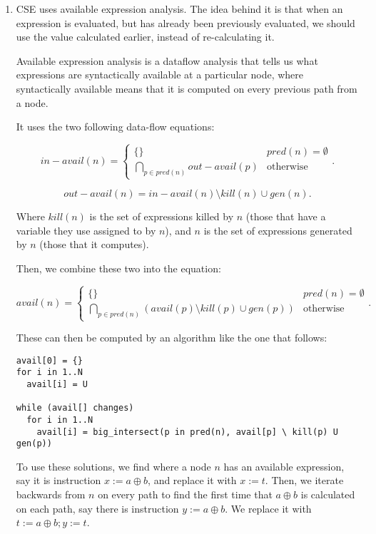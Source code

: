 


\begin{enumerate}[label=(\alph*)]

  \item

    CSE uses available expression analysis. The idea behind it is that when an expression is evaluated, but has already been previously evaluated, we should use the value calculated earlier, instead of re-calculating it.

    Available expression analysis is a dataflow analysis that tells us what expressions are syntactically available at a particular node, where syntactically available means that it is computed on every previous path from a node.

    It uses the two following data-flow equations:

    \[
      in-avail(n) = \begin{cases}\{\} & pred(n) = \emptyset\\\bigcap_{p \in pred(n)} out-avail(p)&\text{otherwise}\end{cases}
    .\] 

    \[
      out-avail(n) = in-avail(n) \setminus kill(n) \cup gen(n)
    .\] 

    Where $kill(n)$ is the set of expressions killed by $n$ (those that have a variable they use assigned to by $n$), and $n$ is the set of expressions generated by $n$ (those that it computes).

    Then, we combine these two into the equation:

    \[
      avail(n) = \begin{cases}\{\}&pred(n) = \emptyset\\\bigcap_{p \in pred(n)} \left(avail(p) \setminus kill(p) \cup gen(p)\right)&\text{otherwise}\end{cases}
    .\] 

    These can then be computed by an algorithm like the one that follows:

\begin{verbatim}
avail[0] = {}
for i in 1..N
  avail[i] = U

while (avail[] changes)
  for i in 1..N
    avail[i] = big_intersect(p in pred(n), avail[p] \ kill(p) U gen(p))
\end{verbatim}

To use these solutions, we find where a node $n$ has an available expression, say it is instruction $x := a \oplus b$, and replace it with $x := t$. Then, we iterate backwards from $n$ on every path to find the first time that $a \oplus b$ is calculated on each path, say there is instruction $y := a \oplus b$. We replace it with $t := a \oplus b;y := t$.


\end{enumerate}
